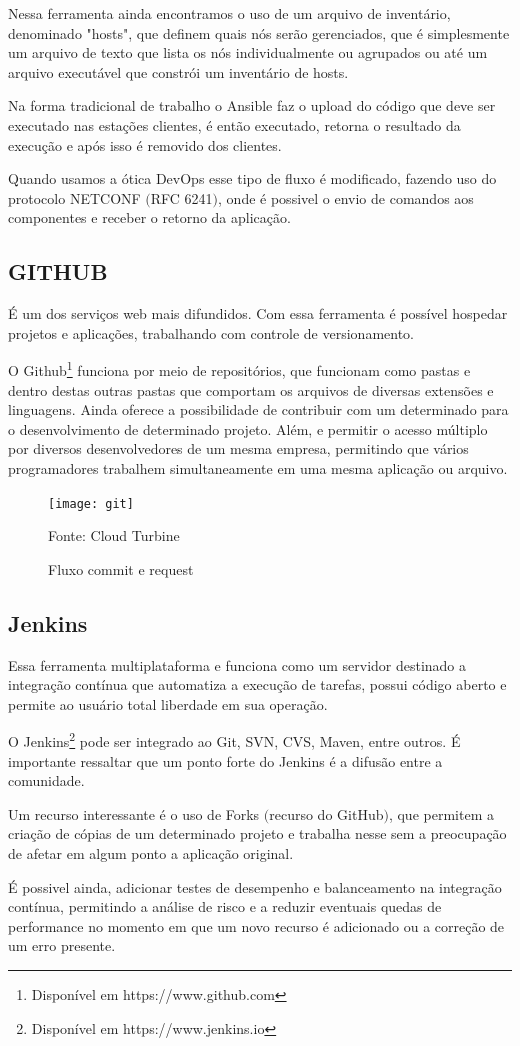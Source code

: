 Nessa ferramenta ainda encontramos o uso de um arquivo de inventário, denominado "hosts", que definem quais nós serão gerenciados, que é simplesmente um arquivo de texto que lista os nós individualmente ou agrupados ou até um arquivo executável que constrói um inventário de hosts.

Na forma tradicional de trabalho o Ansible faz o upload do código que deve ser executado nas estações clientes, é então executado, retorna o resultado da execução e após isso é removido dos clientes.

Quando usamos a ótica DevOps esse tipo de fluxo é modificado, fazendo uso do protocolo NETCONF $($RFC 6241$)$, onde é possivel o envio de comandos aos componentes e receber o retorno da aplicação.


\subsection{GITHUB}
É um dos serviços web mais difundidos. Com essa ferramenta é possível hospedar projetos e aplicações, trabalhando com controle de versionamento.

O Github\footnote{Disponível em https://www.github.com} funciona por meio de repositórios, que funcionam como pastas e dentro destas outras pastas que comportam os arquivos de diversas extensões e linguagens. Ainda oferece a possibilidade de contribuir com um determinado para o desenvolvimento de determinado projeto. Além, e permitir o acesso múltiplo por diversos desenvolvedores de um mesma empresa, permitindo que vários programadores trabalhem simultaneamente em uma mesma aplicação ou arquivo.

\begin{figure} [htb]
	\centering
	\texttt{[image: git]}
	\caption{Fluxo commit e request}
	Fonte: Cloud Turbine
	\label{fig:git}
\end{figure}

\subsection{Jenkins}
Essa ferramenta multiplataforma e funciona como um servidor destinado a integração contínua que automatiza a execução de tarefas, possui código aberto e permite ao usuário total liberdade em sua operação.

O Jenkins\footnote{Disponível em https://www.jenkins.io} pode ser integrado ao Git, SVN, CVS, Maven, entre outros. É importante ressaltar que um ponto forte do Jenkins é a difusão entre a comunidade.

Um recurso interessante é o uso de Forks $($recurso do GitHub$)$, que permitem a criação de cópias de um determinado projeto e trabalha nesse sem a preocupação de afetar em algum ponto a aplicação original.

É possivel ainda, adicionar testes de desempenho e balanceamento na integração contínua, permitindo a análise de risco e a reduzir eventuais quedas de performance no momento em que um novo recurso é adicionado ou a correção de um erro presente.





